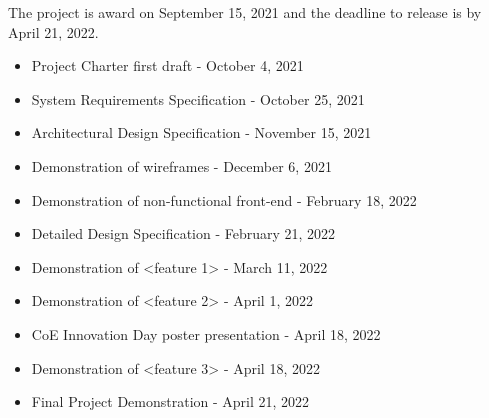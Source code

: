 The project is award on September 15, 2021 and the deadline to release is by April 21, 2022.
\begin{itemize}
  \item Project Charter first draft - October 4, 2021 
  \item System Requirements Specification - October 25, 2021
  \item Architectural Design Specification - November 15, 2021
  \item Demonstration of wireframes -  December 6, 2021
  \item Demonstration of non-functional front-end - February 18, 2022
  \item Detailed Design Specification - February 21, 2022
  \item Demonstration of <feature 1> - March 11, 2022
   \item Demonstration of <feature 2> - April 1, 2022
  \item CoE Innovation Day poster presentation - April 18, 2022
  \item Demonstration of <feature 3> - April 18, 2022
  \item Final Project Demonstration - April 21, 2022
\end{itemize}